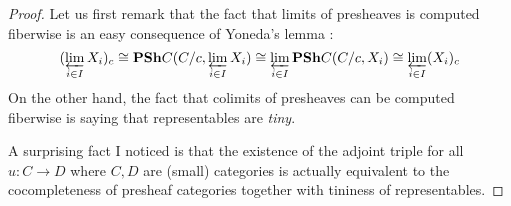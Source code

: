 \documentclass{article}
\begin{document}
\begin{proof}
  


  Let us first remark that the fact that limits of presheaves 
  is computed fiberwise is an easy consequence of Yoneda's lemma : 
  \[
    (\varprojlim_{i \in I} X_i)_c \cong 
    \mathbf{PSh} C (C / c , \varprojlim_{i \in I} X_i)
    \cong \varprojlim_{i \in I} \mathbf{PSh} C (C / c , X_i)
    \cong \varprojlim_{i \in I} (X_i)_c
  \]
  On the other hand,
  the fact that colimits of presheaves can be computed fiberwise
  is saying that representables are \emph{tiny}.

  A surprising fact I noticed is that
  the existence of the adjoint triple
  for all $u : C \to D$ where $C, D$ are (small) categories
  is actually equivalent to
  the cocompleteness of presheaf categories together with
  tininess of representables.


\end{proof}
\end{document}
